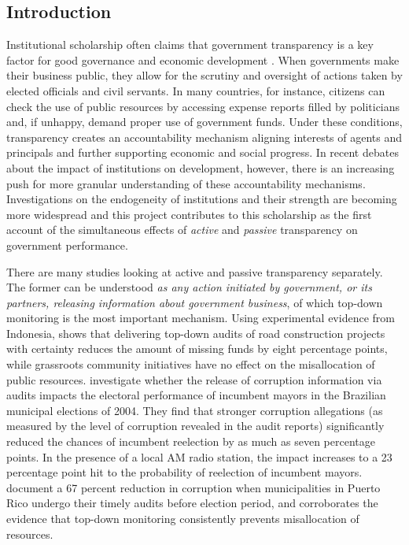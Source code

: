 \documentclass[11pt]{article}
\begin{document}
\subsection{Introduction} \label{subsec:introduction_paper3}

Institutional scholarship often claims that government transparency is a key factor for good governance and economic development \citep{KaufmannGovernanceMatters1999,BoRothsteinGoodGovernance2012}. When governments make their business public, they allow for the scrutiny and oversight of actions taken by elected officials and civil servants. In many countries, for instance, citizens can check the use of public resources by accessing expense reports filled by politicians and, if unhappy, demand proper use of government funds. Under these conditions, transparency creates an accountability mechanism aligning interests of agents and principals and further supporting economic and social progress. In recent debates about the impact of institutions on development, however, there is an increasing push for more granular understanding of these accountability mechanisms. Investigations on the endogeneity of institutions and their strength \citep{AcemogluChapterInstitutionsFundamental2005,LevitskyVariationInstitutionalStrength2009,DalBoInstitutionsBehaviorExperimental2010} are becoming more widespread and this project contributes to this scholarship as the first account of the simultaneous effects of \emph{active} and \emph{passive} transparency on government performance.

There are many studies looking at active and passive transparency separately. The former can be understood \emph{as any action initiated by government, or its partners, releasing information about government business}, of which top-down monitoring is the most important mechanism. Using experimental evidence from Indonesia, \citet{OlkenMonitoringCorruptionEvidence2007c} shows that delivering top-down audits of road construction projects with certainty reduces the amount of missing funds by eight percentage points, while grassroots community initiatives have no effect on the misallocation of public resources. \citet{FerrazExposingCorruptPoliticians2008b} investigate whether the release of corruption information via audits impacts the electoral performance of incumbent mayors in the Brazilian municipal elections of 2004. They find that stronger corruption allegations (as measured by the level of corruption revealed in the audit reports) significantly reduced the chances of incumbent reelection by as much as seven percentage points. In the presence of a local AM radio station, the impact increases to a 23 percentage point hit to the probability of reelection of incumbent mayors. \citet{BobonisMonitoringCorruptiblePoliticians2016} document a 67 percent reduction in corruption when municipalities in Puerto Rico undergo their timely audits before election period, and corroborates the evidence that top-down monitoring consistently prevents misallocation of resources.
\end{document}
